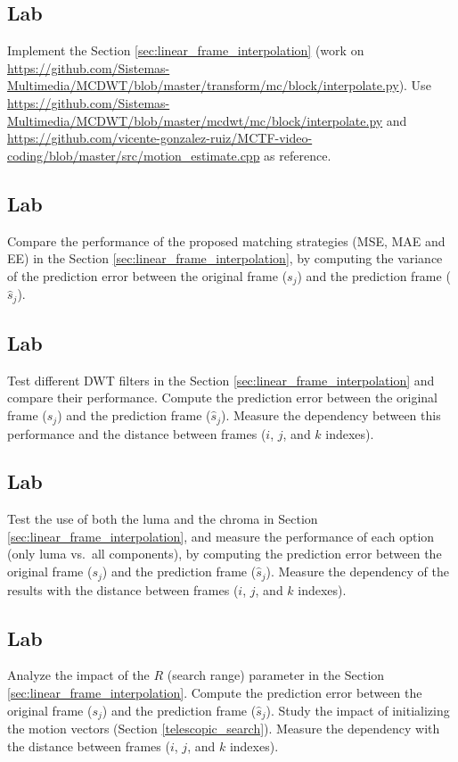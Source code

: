 \subsection{Lab}
Implement the Section \ref{sec:linear_frame_interpolation} (work on
\url{https://github.com/Sistemas-Multimedia/MCDWT/blob/master/transform/mc/block/interpolate.py}).
Use
\url{https://github.com/Sistemas-Multimedia/MCDWT/blob/master/mcdwt/mc/block/interpolate.py}
and
\url{https://github.com/vicente-gonzalez-ruiz/MCTF-video-coding/blob/master/src/motion\_estimate.cpp}
as reference.

\subsection{Lab}
Compare the performance of the proposed matching strategies (MSE, MAE
and EE) in the Section \ref{sec:linear_frame_interpolation}, by computing
the variance of the prediction error between the original frame
(\(s_j\)) and the prediction frame (\(\hat{s}_j\)).

\subsection{Lab}
Test different DWT filters in the
Section \ref{sec:linear_frame_interpolation} and compare their performance.
Compute the prediction error between the original frame (\(s_j\)) and
the prediction frame (\(\hat{s}_j\)). Measure the dependency between
this performance and the distance between frames (\(i\), \(j\), and
\(k\) indexes).

\subsection{Lab}
Test the use of both the luma and the chroma in
Section \ref{sec:linear_frame_interpolation}, and measure the performance of
each option (only luma vs.~all components), by computing the prediction
error between the original frame (\(s_j\)) and the prediction frame
(\(\hat{s}_j\)). Measure the dependency of the results with the distance
between frames (\(i\), \(j\), and \(k\) indexes).

\subsection{Lab}
Analyze the impact of the \(R\) (search range) parameter in the
Section \ref{sec:linear_frame_interpolation}. Compute the prediction error
between the original frame (\(s_j\)) and the prediction frame
(\(\hat{s}_j\)). Study the impact of initializing the motion vectors
(Section \ref{telescopic_search}). Measure the dependency with the
distance between frames (\(i\), \(j\), and \(k\) indexes).

